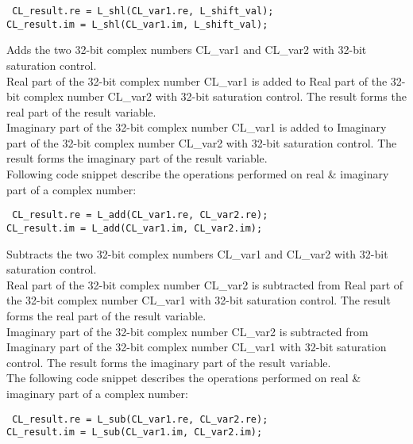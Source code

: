 {\tt {} CL\_result.re = L\_shl(CL\_var1.re, L\_shift\_val);\\
 CL\_result.im = L\_shl(CL\_var1.im, L\_shift\_val);
}


Adds the two 32-bit complex numbers CL\_var1 and CL\_var2 with 32-bit saturation control.\\
Real part of the 32-bit complex number CL\_var1 is added to Real part of the 32-bit complex number CL\_var2 with 32-bit saturation control.
The result forms the real part of the result variable.\\
Imaginary part of the 32-bit complex number CL\_var1 is added to Imaginary part of the 32-bit complex number CL\_var2 with 32-bit saturation control.
The result forms the imaginary part of the result variable.\\
Following code snippet describe the operations performed on real \& imaginary part of a complex number:

{\tt {} CL\_result.re = L\_add(CL\_var1.re, CL\_var2.re);\\
 CL\_result.im = L\_add(CL\_var1.im, CL\_var2.im);
}


Subtracts the two 32-bit complex numbers CL\_var1 and CL\_var2 with 32-bit saturation control.\\
Real part of the 32-bit complex number CL\_var2 is subtracted from Real part of the 32-bit complex number CL\_var1 with 32-bit saturation control.
The result forms the real part of the result variable.\\
Imaginary part of the 32-bit complex number CL\_var2 is subtracted from Imaginary part of the 32-bit complex number CL\_var1 with 32-bit saturation control.
The result forms the imaginary part of the result variable.\\
The following code snippet describes the operations performed on real \& imaginary part of a complex number:

{\tt {} CL\_result.re = L\_sub(CL\_var1.re, CL\_var2.re);\\
 CL\_result.im = L\_sub(CL\_var1.im, CL\_var2.im);
}


